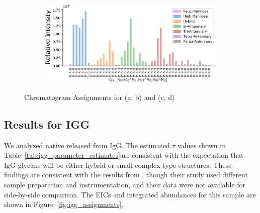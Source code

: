 \begin{figure}[tb]
\begin{minipage}{1\linewidth}
\begin{subfigure}[b]{0.49\linewidth}
                \subcaption{
                    \label{fig:phil82_assignment:c}
                }
            \end{subfigure}
            \vspace{0pt}
            \begin{subfigure}[b]{0.49\linewidth}
                \includegraphics[width=1\linewidth, valign=b]{figure/dp_phil82_abundances.eps}
                \subcaption{
                    \label{fig:phil82_assignment:d}
                }
            \end{subfigure}
        \end{minipage}
        \caption{Chromatogram Assignments for \phil (a, b) and \dpphil (c, d)
            \label{fig:phil82_assignments}
        }
    \end{figure}

\FloatBarrier
\subsection{Results for IGG}
    We analyzed native \nglycans released from IgG. The estimated $\tau$ values shown in
    Table~\ref{tab:igg_parameter_estimates}are consistent with the expectation that IgG
    glycans will be either hybrid or small complex-type structures. These findings are
    consistent with the results from \citealp{Peltoniemi2013}, though their study used
    different sample preparation and instrumentation, and their data were not available
    for side-by-side comparison. The EICs and integrated abundances for this sample are
    shown in Figure~\ref{fig:igg_assignments}.
    
